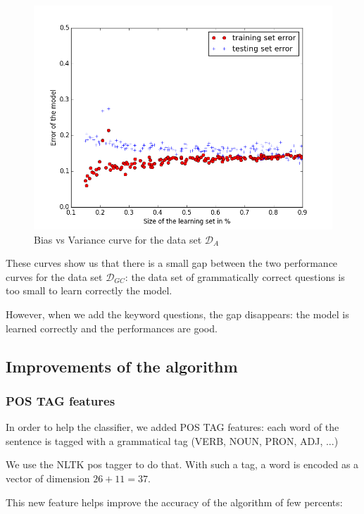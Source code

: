 \begin{figure}[!ht]
  \centering
  \caption{Bias vs Variance curve for the data set  $\mathcal{D}_{A}$ }
  \label{sandalone:bias_vs_variance_3}
    \includegraphics[scale=0.5]{../NLP-standalone-images/BiasVsVarianceD_A.png}
\end{figure}

These curves show us that there is a small gap between the two performance curves for the data set $\mathcal{D}_{GC}$: the data set of grammatically correct questions is too small to learn correctly the model.

However, when we add the keyword questions, the gap disappears: the model is learned correctly and the performances are good.

\subsection{Improvements of the algorithm}

\subsubsection{POS TAG features}

In order to help the classifier, we added POS TAG features: each word of the sentence is tagged with a grammatical tag (VERB, NOUN, PRON, ADJ, ...)

We use the NLTK pos tagger to do that. With such a tag, a word is encoded as a vector of dimension $26+11 = 37$.

This new feature helps improve the accuracy of the algorithm of few percents:

